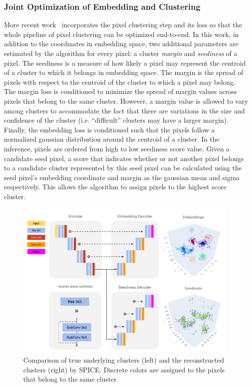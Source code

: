\documentclass{ws-rv9x6}
\begin{document}
\subsubsection{Joint Optimization of Embedding and Clustering}
More recent work~\cite{8953222} incorporates the pixel clustering step and its loss so that the whole pipeline of pixel clustering can be optimized end-to-end. In this  work, in addition to the coordinates in embedding space, two additional parameters are estimated by the algorithm for every pixel: a cluster {\it margin} and {\it seediness} of a pixel. The seediness is a measure of how likely a pixel may represent the centroid of a cluster to which it belongs in embedding space. The margin is the spread of pixels with respect to the centroid of the cluster to which a pixel may belong. The margin loss is conditioned to minimize the spread of margin values across pixels that belong to the same cluster. However, a margin value is allowed to vary among clusters to accommodate the fact that there are variations in the size and confidence of the cluster (i.e.  ``difficult'' clusters may have a larger margin). Finally, the embedding loss is conditioned such that the pixels follow a normalized gaussian distribution around the centroid of a cluster. In the inference, pixels are ordered from high to low seediness score value. Given a candidate seed pixel, a score that indicates whether or not another pixel belongs to a candidate cluster represented by this seed pixel can be calculated using the seed pixel's embedding coordinate and margin as the gaussian mean and sigma respectively. This allows the algorithm to assign pixels to the highest score cluster. 
\begin{figure}[t]
    \centering
    \includegraphics[width=0.98\textwidth]{figures/spice_architecture.pdf}
    \caption{Comparison of true underlying clusters (left) and the reconstructed clusters (right) by SPICE. Discrete colors are assigned to the pixels that belong to the same cluster.  }
    \label{fig:clustering:spice_architecture}
\end{figure}
\end{document}
